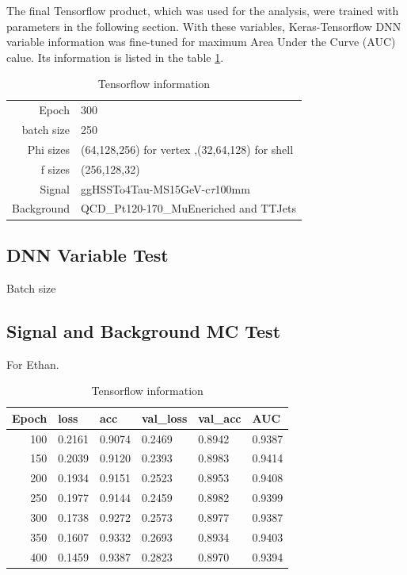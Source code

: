 The final Tensorflow product, which was used for the analysis, were trained with parameters in the following section. 
With these variables, Keras-Tensorflow DNN variable information was fine-tuned for maximum Area Under the Curve (AUC) calue.
Its information is listed in the table \ref{tab:ROIParam}.
\begin{table}[htb]
\caption{Tensorflow information}
\begin{center}
\begin{tabular}{r|l}\hline
Epoch & 300 \\
batch size & 250 \\
Phi sizes & (64,128,256) for vertex ,(32,64,128) for shell \\
f sizes & (256,128,32) \\
Signal & ggHSSTo4Tau-MS15GeV-c$\tau$100mm  \\
Background & QCD\_Pt120-170\_MuEneriched and TTJets \\
 \hline
 \hline
\end{tabular}
\label{tab:ROIParam}
\end{center}
\end{table}
\subsection{DNN Variable Test}\label{sec:Ethan}
Batch size 


\subsection{Signal and Background MC Test}\label{sec:Ethan2}
For Ethan.

\begin{table}[htb]
\caption{Tensorflow information}
\begin{center}
\begin{tabular}{r|l|l|l|l|l}\hline
Epoch &  loss & acc &  val\_loss & val\_acc & AUC\\
\hline
100& 0.2161 & 0.9074 & 0.2469 & 0.8942 & 0.9387\\
150& 0.2039 & 0.9120 & 0.2393 & 0.8983 & 0.9414\\
200& 0.1934 & 0.9151 & 0.2523 & 0.8953 & 0.9408\\
250& 0.1977 & 0.9144 & 0.2459 & 0.8982 & 0.9399\\
300& 0.1738 & 0.9272 & 0.2573 & 0.8977 & 0.9387\\
350& 0.1607 & 0.9332 & 0.2693 & 0.8934 & 0.9403\\
400& 0.1459 & 0.9387 & 0.2823 & 0.8970 & 0.9394\\
\hline
\end{tabular}
\label{tab:Epoch Training}
\end{center}
\end{table}

